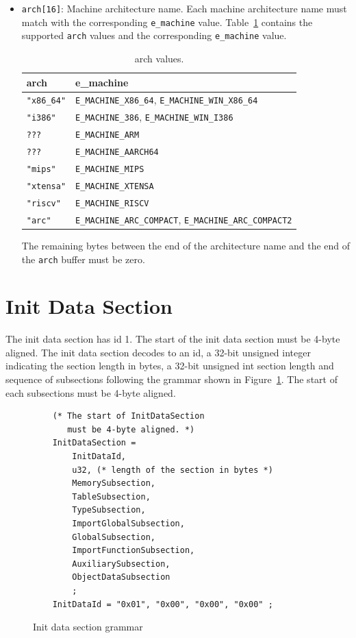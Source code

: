 \documentclass{article}
\begin{document}
\begin{itemize}
    \item \verb|arch[16]|:
        Machine architecture name.
        Each machine architecture name must match with the corresponding \verb|e_machine| value.
        Table~\ref{table:arch-legal-values} contains the supported \verb|arch| values and the corresponding \verb|e_machine| value.
        \begin{table}[H]
        \centering
        \begin{tabular}{ll}
            \hline
            arch & e\_machine \\
            \hline
            \verb|"x86_64"| & \verb|E_MACHINE_X86_64|, \verb|E_MACHINE_WIN_X86_64| \\
            \verb|"i386"|   & \verb|E_MACHINE_386|, \verb|E_MACHINE_WIN_I386| \\
            \verb|???|      & \verb|E_MACHINE_ARM| \\
            \verb|???|      & \verb|E_MACHINE_AARCH64| \\
            \verb|"mips"|   & \verb|E_MACHINE_MIPS| \\
            \verb|"xtensa"| & \verb|E_MACHINE_XTENSA| \\
            \verb|"riscv"|  & \verb|E_MACHINE_RISCV|\\
            \verb|"arc"|    & \verb|E_MACHINE_ARC_COMPACT|, \verb|E_MACHINE_ARC_COMPACT2| \\
            \hline
        \end{tabular}
        \caption{arch values.}
        \label{table:arch-legal-values}
        \end{table}

        The remaining bytes between the end of the architecture name and the end of the \verb|arch| buffer must be zero.

\end{itemize}

\section{Init Data Section}
The init data section has id 1.
The start of the init data section must be 4-byte aligned.
The init data section decodes to an id, a 32-bit unsigned integer indicating the section length in bytes, a 32-bit unsigned int section length and sequence of subsections following the grammar shown in Figure~\ref{fig:init-data-section-grammar}.
The start of each subsections must be 4-byte aligned.

\begin{figure}[H]
\begin{verbatim}
    (* The start of InitDataSection
       must be 4-byte aligned. *)
    InitDataSection =
        InitDataId,
        u32, (* length of the section in bytes *)
        MemorySubsection,
        TableSubsection,
        TypeSubsection,
        ImportGlobalSubsection,
        GlobalSubsection,
        ImportFunctionSubsection,
        AuxiliarySubsection,
        ObjectDataSubsection
        ;
    InitDataId = "0x01", "0x00", "0x00", "0x00" ;
\end{verbatim}
\caption{Init data section grammar}
\label{fig:init-data-section-grammar}
\end{figure}
\end{document}
